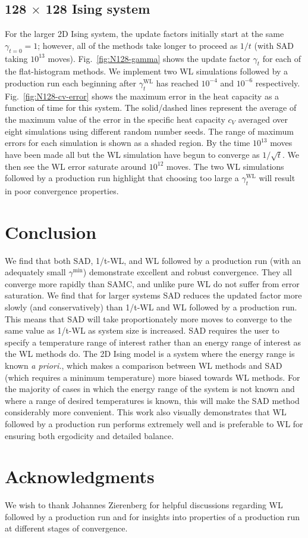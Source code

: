 \subsection{128 $\times$ 128 Ising system}
For the larger 2D Ising system, the update factors initially
start at the same $\gamma_{t=0} = 1$; however, all of the methods take longer
to proceed as $1/t$ (with SAD taking $10^{13}$ moves). Fig.~\ref{fig:N128-gamma} shows the update factor $\gamma_t$ for each of the 
flat-histogram methods. 
We implement two WL simulations followed by a production run each beginning
after $\gamma^{\text{WL}}_t$ has reached $10^{-4}$ and $10^{-6}$ respectively.
Fig.~\ref{fig:N128-cv-error} shows the maximum error in the heat capacity as a 
function of time for this system. The solid/dashed lines represent the average
of the maximum value of the error in the specific heat capacity $c_V$ averaged
over eight simulations using different random number seeds. The range of maximum
errors for each simulation is shown as a shaded region. By
the time $10^{13}$ moves have been made all but the WL simulation have begun to
converge as $1/\sqrt{t}$. We then see the WL error saturate around $10^{12}$
moves. The two WL simulations followed by a production run highlight that
choosing too large a $\gamma^{\text{WL}}_t$ will result in poor convergence
properties.

\section{Conclusion}
We find that both SAD, 1/t-WL, and WL followed by a production run
(with an adequately small $\gamma^{\min}$) demonstrate excellent and robust
convergence. They all converge more rapidly than SAMC, and unlike pure WL do
not suffer from
error saturation. We find that for larger systems SAD reduces the updated factor
more slowly (and conservatively) than 1/t-WL and WL followed by a
production run. This means that SAD will take
proportionately more moves to converge to the same value as 1/t-WL as system
size is increased. SAD requires the user to specify a temperature range of
interest rather than an energy range of interest as the WL methods do. The 2D
Ising model is a system where the energy range is known \emph{a priori.}, which
makes a comparison between WL methods and SAD (which requires a minimum
temperature) more biased towards WL methods. For the majority of cases in which
the energy range of the system is not known and where a range of desired
temperatures is known, this will make the SAD method
considerably more convenient. This work also visually demonstrates
that WL followed by a production run performs extremely well and is preferable
to WL for ensuring both ergodicity and detailed balance.

\section{Acknowledgments}

We wish to thank Johannes Zierenberg for helpful discussions regarding WL followed by a production run and for insights into properties of a production run at different stages of convergence.